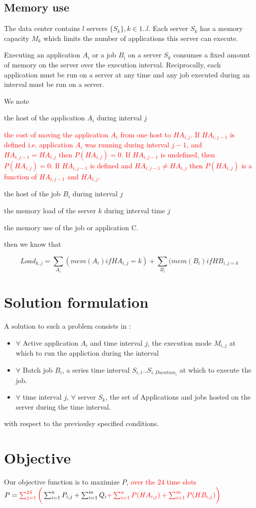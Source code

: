 \documentclass[a4paper]{article}
\newcommand\gilles[1]{\textcolor{red}{#1}}
\begin{document}
\subsection{Memory use}

The data center contains $l$ servers $\{S_k\}, k\in 1..l$. Each server $S_k$ has a memory capacity $M_k$ which limits the number of applications this server can execute.

Executing an application $A_i$ or a job $B_i$ on a server $S_k$ consumes a fixed amount of memory 
on the server over the execution interval. Reciprocally, each application must be run on a server at any time and any job executed during an interval must be run on a server.

We note
\begin{description}
\item[$HA_{i,j}$] the host of the application $A_i$ during interval $j$
\gilles{
\item[$P(HA_{i,j})$] the cost of moving the application $A_i$ from one host to $HA_{i,j}$. If $HA_{i,j-1}$ is defined i.e. application $A_i$ was running during interval $j-1$, and $HA_{i,j-1} = HA_{i,j}$ then $P(HA_{i,j}) = 0$. If $HA_{i,j-1}$ is undefined, then $P(HA_{i,j}) = 0$. If $HA_{i,j-1}$ is defined and $HA_{i,j-1} \neq HA_{i,j}$ then $P(HA_{i,j})$ is a function of $HA_{i,j-1}$ and $HA_{i,j}$. }
\item[$HB_{i,j}$] the host of the job $B_i$ during interval $j$
\item[$Load_{k,j}$] the memory load of the server $k$ during interval time $j$
\item[$mem(C)$] the memory use of the job or application C.
\end{description}

then we know that

\begin{equation}
Load_{k,j} = \sum_{A_i}(mem(A_i) if HA_{i,j}=k) + \sum_{B_i}(mem(B_i) if HB_{i,j=k}
\end{equation}

\section{Solution formulation}

A solution to such a problem consists in :
\begin{itemize}
\item $\forall$ Active application $A_i$ and time interval $j$, the execution mode $M_{i,j}$ at which to run the appliction during the interval
\item $\forall$ Batch job $B_i$, a series time interval $S_{i,1}..S_{i, Duration_i}$ at which to execute the job.
\item $\forall$ time interval $j$, $\forall$ server $S_k $, the set of Applications and jobs hosted on the server during the time interval.
\end{itemize}
with respect to the previoulsy specified conditions.

\section{Objective}
Our objective function is to maximize $P$, \gilles{over the 24 time slots}\\
$P= \gilles{\sum_{j=1}^{24} \bigg(} \sum_{i=1}^{n} {P_{i,j}} + \sum_{i=1}^{m} {Q_i} \gilles{+ \sum_{i=1}^{n} {P(HA_{i,j})} + \sum_{i=1}^{m} {P(HB_{i,j})} \bigg)} $
\end{document}
